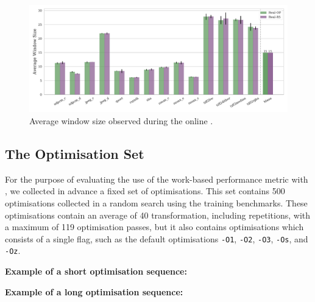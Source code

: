 \begin{figure}[htb]
    \centering
    \includegraphics[width=\textwidth]{figs/window-size.pdf}
    \caption{Average window size observed during the online {\itercomp}.}
    \label{fig:window-size}
\end{figure}


\subsection{The Optimisation Set}

For the purpose of evaluating the use of the work-based performance metric with {\itercomp}, we collected in advance a fixed set of optimisations.
This set contains 500 optimisations collected in a random search using the training benchmarks.
These optimisations contain an average of 40 transformation, including repetitions, with a maximum of 119 optimisation passes, but it also contains optimisations which consists of a single flag, such as the default optimisations \texttt{-O1}, \texttt{-O2}, \texttt{-O3}, \texttt{-Os}, and \texttt{-Oz}.

  \begin{minipage}{0.9\textwidth}
     \vspace{1em}
     \singlespace
     \noindent\textbf{Example of a short optimisation sequence:}\vspace{-1ex}
  \end{minipage}

  \begin{minipage}{0.9\textwidth}
     \vspace{1em}
     \singlespace
     \noindent\textbf{Example of a long optimisation sequence:}\vspace{-1ex}
  \end{minipage}

